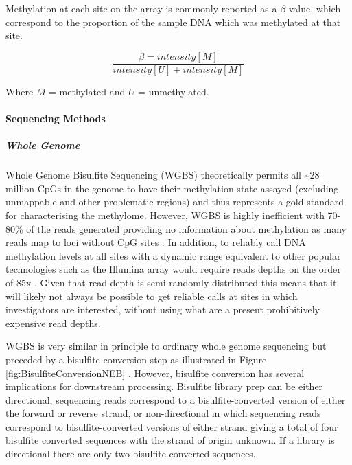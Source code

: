 \documentclass[
]{book}
\begin{document}
Methylation at each site on the array is commonly reported as a \(\beta\) value, which correspond to the proportion of the sample DNA which was methylated at that site.

\[\frac{\beta=intensity[M]}{intensity[U] + intensity[M]}\]

Where \(M\) = methylated and \(U\) = unmethylated.

\hypertarget{sequencing-methods}{%
\paragraph{Sequencing Methods}\label{sequencing-methods}}

\hypertarget{whole-genome}{%
\subparagraph{Whole Genome}\label{whole-genome}}

Whole Genome Bisulfite Sequencing (WGBS) theoretically permits all \textasciitilde28 million CpGs in the genome to have their methylation state assayed (excluding unmappable and other problematic regions) and thus represents a gold standard for characterising the methylome. However, WGBS is highly inefficient with 70-80\% of the reads generated providing no information about methylation as many reads map to loci without CpG sites \citep{Ziller2013}. In addition, to reliably call DNA methylation levels at all sites with a dynamic range equivalent to other popular technologies such as the Illumina array would require reads depths on the order of 85x \citep{Libertini2016}. Given that read depth is semi-randomly distributed this means that it will likely not always be possible to get reliable calls at sites in which investigators are interested, without using what are a present prohibitively expensive read depths.

WGBS is very similar in principle to ordinary whole genome sequencing but preceded by a bisulfite conversion step as illustrated in Figure \ref{fig:BisulfiteConversionNEB} \citep{Bock2010}. However, bisulfite conversion has several implications for downstream processing. Bisulfite library prep can be either directional, sequencing reads correspond to a bisulfite-converted version of either the forward or reverse strand, or non-directional in which sequencing reads correspond to bisulfite-converted versions of either strand giving a total of four bisulfite converted sequences with the strand of origin unknown. If a library is directional there are only two bisulfite converted sequences.
\end{document}
